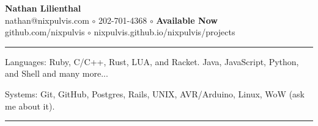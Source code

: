 \documentclass[10pt,letterpaper]{article}
\newenvironment{indentsection}[1]
{\begin{list}{}
  {\setlength{\leftmargin}{#1}} \item[]
}
{\end{list}}
\begin{document}
\begin{center}
  \huge \textbf{Nathan Lilienthal} \\
  \large
  nathan@nixpulvis.com
  $\circ$
  202-701-4368
  $\circ$
  {\bf Available Now}
  \\
  github.com/nixpulvis
  $\circ$
  nixpulvis.github.io/nixpulvis/projects
  \vspace{-0.2em}
\end{center}


\hrule
\begin{indentsection}{\parindent}
\begin{description*}
  \item[Languages:] Ruby, C/C++, Rust, LUA, and Racket. Java, JavaScript,
  Python, and Shell and many more...
  \item[Systems:] Git, GitHub, Postgres, Rails, UNIX, AVR/Arduino, Linux, WoW
  (ask me about it).
\end{description*}
\end{indentsection}


\hrule
\vspace{-0.4em}
\end{document}
